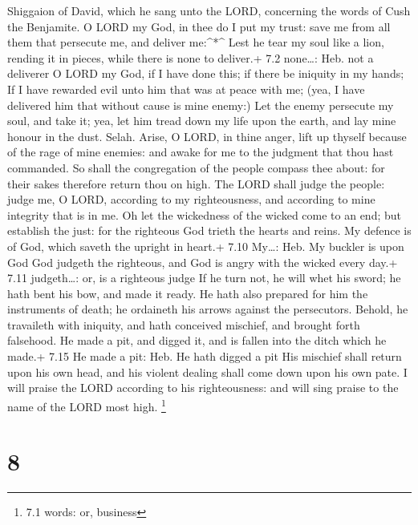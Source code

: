 Shiggaion of David, which he sang unto the LORD, concerning the words of
Cush the Benjamite.  O LORD my God, in thee do I put my
trust: save me from all them that persecute me, and deliver me:\^{}*\^{}
 Lest he tear my soul like a lion, rending it in pieces,
while there is none to deliver.+ 7.2 none\ldots: Heb. not a deliverer
 O LORD my God, if I have done this; if there be iniquity in
my hands;  If I have rewarded evil unto him that was at
peace with me; (yea, I have delivered him that without cause is mine
enemy:)  Let the enemy persecute my soul, and take it; yea,
let him tread down my life upon the earth, and lay mine honour in the
dust. Selah.  Arise, O LORD, in thine anger, lift up thyself
because of the rage of mine enemies: and awake for me to the judgment
that thou hast commanded.  So shall the congregation of the
people compass thee about: for their sakes therefore return thou on
high.  The LORD shall judge the people: judge me, O LORD,
according to my righteousness, and according to mine integrity that is
in me.  Oh let the wickedness of the wicked come to an end;
but establish the just: for the righteous God trieth the hearts and
reins.  My defence is of God, which saveth the upright in
heart.+ 7.10 My\ldots: Heb. My buckler is upon God  God
judgeth the righteous, and God is angry with the wicked every day.+ 7.11
judgeth\ldots: or, is a righteous judge  If he turn not, he
will whet his sword; he hath bent his bow, and made it ready.
 He hath also prepared for him the instruments of death; he
ordaineth his arrows against the persecutors.  Behold, he
travaileth with iniquity, and hath conceived mischief, and brought forth
falsehood.  He made a pit, and digged it, and is fallen
into the ditch which he made.+ 7.15 He made a pit: Heb. He hath digged a
pit  His mischief shall return upon his own head, and his
violent dealing shall come down upon his own pate.  I will
praise the LORD according to his righteousness: and will sing praise to
the name of the LORD most high. \footnote{7.1 words: or, business}

\hypertarget{section-7}{%
\section{8}\label{section-7}}

